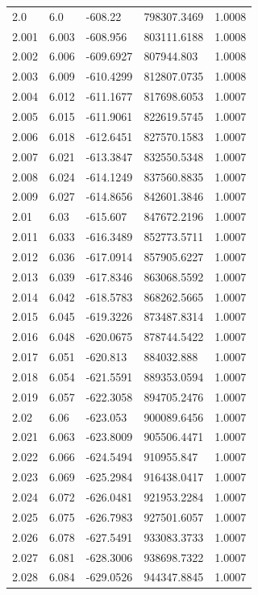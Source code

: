 \begin{tabular}{lllll}
2.0 & 6.0 & -608.22 & 798307.3469 & 1.0008 \\
2.001 & 6.003 & -608.956 & 803111.6188 & 1.0008 \\
2.002 & 6.006 & -609.6927 & 807944.803 & 1.0008 \\
2.003 & 6.009 & -610.4299 & 812807.0735 & 1.0008 \\
2.004 & 6.012 & -611.1677 & 817698.6053 & 1.0007 \\
2.005 & 6.015 & -611.9061 & 822619.5745 & 1.0007 \\
2.006 & 6.018 & -612.6451 & 827570.1583 & 1.0007 \\
2.007 & 6.021 & -613.3847 & 832550.5348 & 1.0007 \\
2.008 & 6.024 & -614.1249 & 837560.8835 & 1.0007 \\
2.009 & 6.027 & -614.8656 & 842601.3846 & 1.0007 \\
2.01 & 6.03 & -615.607 & 847672.2196 & 1.0007 \\
2.011 & 6.033 & -616.3489 & 852773.5711 & 1.0007 \\
2.012 & 6.036 & -617.0914 & 857905.6227 & 1.0007 \\
2.013 & 6.039 & -617.8346 & 863068.5592 & 1.0007 \\
2.014 & 6.042 & -618.5783 & 868262.5665 & 1.0007 \\
2.015 & 6.045 & -619.3226 & 873487.8314 & 1.0007 \\
2.016 & 6.048 & -620.0675 & 878744.5422 & 1.0007 \\
2.017 & 6.051 & -620.813 & 884032.888 & 1.0007 \\
2.018 & 6.054 & -621.5591 & 889353.0594 & 1.0007 \\
2.019 & 6.057 & -622.3058 & 894705.2476 & 1.0007 \\
2.02 & 6.06 & -623.053 & 900089.6456 & 1.0007 \\
2.021 & 6.063 & -623.8009 & 905506.4471 & 1.0007 \\
2.022 & 6.066 & -624.5494 & 910955.847 & 1.0007 \\
2.023 & 6.069 & -625.2984 & 916438.0417 & 1.0007 \\
2.024 & 6.072 & -626.0481 & 921953.2284 & 1.0007 \\
2.025 & 6.075 & -626.7983 & 927501.6057 & 1.0007 \\
2.026 & 6.078 & -627.5491 & 933083.3733 & 1.0007 \\
2.027 & 6.081 & -628.3006 & 938698.7322 & 1.0007 \\
2.028 & 6.084 & -629.0526 & 944347.8845 & 1.0007 \\

\end{tabular}
